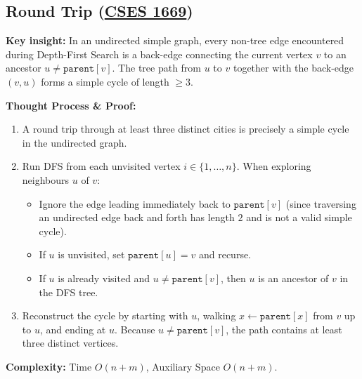 \documentclass[11pt]{article}
\newcommand{\insight}[1]{\par\medskip\noindent\textbf{Key insight:} #1\par\smallskip}
\begin{document}
\subsection{Round Trip (\href{https://cses.fi/problemset/task/1669}{CSES 1669})}

\insight{In an undirected simple graph, every non-tree edge encountered during Depth-First Search is a back-edge connecting the current vertex $v$ to an ancestor $u \neq \texttt{parent}[v]$. The tree path from $u$ to $v$ together with the back-edge $(v, u)$ forms a simple cycle of length $\ge 3$.}

\textbf{Thought Process \& Proof:}
\begin{enumerate}
    \item A round trip through at least three distinct cities is precisely a simple cycle in the undirected graph.
    \item Run DFS from each unvisited vertex $i \in \{1, \dots, n\}$. When exploring neighbours $u$ of $v$:
    \begin{itemize}
        \item Ignore the edge leading immediately back to $\texttt{parent}[v]$ (since traversing an undirected edge back and forth has length $2$ and is not a valid simple cycle).
        \item If $u$ is unvisited, set $\texttt{parent}[u] = v$ and recurse.
        \item If $u$ is already visited and $u \neq \texttt{parent}[v]$, then $u$ is an ancestor of $v$ in the DFS tree.
    \end{itemize}
    \item Reconstruct the cycle by starting with $u$, walking $x \leftarrow \texttt{parent}[x]$ from $v$ up to $u$, and ending at $u$. Because $u \neq \texttt{parent}[v]$, the path contains at least three distinct vertices.
\end{enumerate}

\textbf{Complexity:} Time $O(n + m)$, Auxiliary Space $O(n + m)$.
\end{document}
